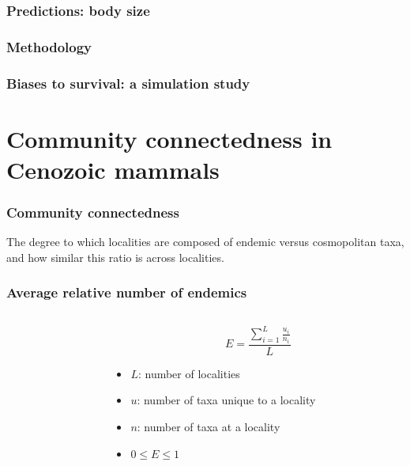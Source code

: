 \documentclass{beamer} \usepackage{amsmath,amsthm}
\begin{document}
\begin{frame}
  \frametitle{Predictions: body size}
\end{frame}

\begin{frame}
  \frametitle{Methodology}
\end{frame}

\begin{frame}
  \frametitle{Biases to survival: a simulation study}
\end{frame}

\section{Community connectedness in Cenozoic mammals}

\begin{frame}
  \frametitle{Community connectedness}
  \begin{definition}
    The degree to which localities are composed of endemic versus cosmopolitan taxa, and how similar this ratio is across localities.
  \end{definition}
\end{frame}

\begin{frame}
  \frametitle{Average relative number of endemics}

  \begin{columns}
    \begin{column}{0.5\textwidth}
    \end{column}
    \begin{column}{0.5\textwidth}
      \[
        E = \frac{\sum_{i = 1}^{L} \frac{u_{i}}{n_{i}}}{L}
      \]

      \begin{itemize}
        \item \(L\): number of localities
        \item \(u\): number of taxa unique to a locality
        \item \(n\): number of taxa at a locality
        \item \(0 \leq E \leq 1\)
      \end{itemize}
    \end{column}
  \end{columns}
\end{frame}
\end{document}
